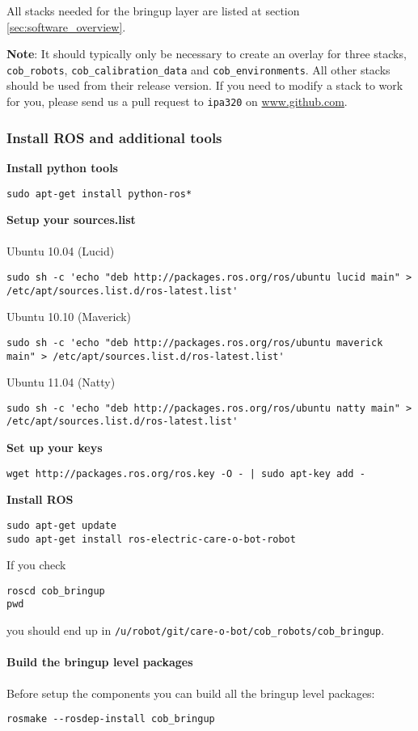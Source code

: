 All stacks needed for the bringup layer are listed at section \ref{sec:software_overview}. 

\textbf{Note}: It should typically only be necessary to create an overlay for three stacks, \texttt{cob\_robots}, \texttt{cob\_calibration\_data} and \texttt{cob\_environments}. All other stacks should be used from their release version. If you need to modify a stack to work for you, please send us a pull request to \texttt{ipa320} on \url{www.github.com}.


\subsubsection{Install ROS and additional tools}
\textbf{Install python tools}
\begin{lstlisting}
sudo apt-get install python-ros*
\end{lstlisting}
\textbf{Setup your sources.list}
\\
\\Ubuntu 10.04 (Lucid)
\begin{lstlisting}
sudo sh -c 'echo "deb http://packages.ros.org/ros/ubuntu lucid main" > /etc/apt/sources.list.d/ros-latest.list'
\end{lstlisting}
Ubuntu 10.10 (Maverick)
\begin{lstlisting}
sudo sh -c 'echo "deb http://packages.ros.org/ros/ubuntu maverick main" > /etc/apt/sources.list.d/ros-latest.list'
\end{lstlisting}
Ubuntu 11.04 (Natty)
\begin{lstlisting}
sudo sh -c 'echo "deb http://packages.ros.org/ros/ubuntu natty main" > /etc/apt/sources.list.d/ros-latest.list'
\end{lstlisting}
\textbf{Set up your keys}
\begin{lstlisting}
wget http://packages.ros.org/ros.key -O - | sudo apt-key add -
\end{lstlisting}
\textbf{Install ROS}
\begin{lstlisting}
sudo apt-get update
sudo apt-get install ros-electric-care-o-bot-robot
\end{lstlisting}

If you check 
\begin{lstlisting}
roscd cob_bringup
pwd
\end{lstlisting}
you should end up in \texttt{/u/robot/git/care-o-bot/cob\_robots/cob\_bringup}.

\paragraph{Build the bringup level packages}
Before setup the components you can build all the bringup level packages:
\begin{lstlisting}
rosmake --rosdep-install cob_bringup
\end{lstlisting}

